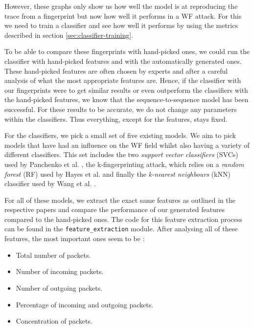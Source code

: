 However, these graphs only show us how well the model is at reproducing the trace from a fingerprint but now how well it performs in a WF attack.
For this we need to train a classifier and see how well it performs by using the metrics described in section \ref{sec:classifier-training}.

To be able to compare these fingerprints with hand-picked ones, we could run the classifier with hand-picked features and with the automatically generated ones.
These hand-picked features are often chosen by experts and after a careful analysis of what the most appropriate features are.
Hence, if the classifier with our fingerprints were to get similar results or even outperform the classifiers with the hand-picked features, we know that the sequence-to-sequence model has been successful.
For these results to be accurate, we do not change any parameters within the classifiers.
Thus everything, except for the features, stays fixed.

For the classifiers, we pick a small set of five existing models.
We aim to pick models that have had an influence on the WF field whilst also having a variety of different classifiers.
This set includes the two \textit{support vector classifiers} (SVCs) used by Panchenko et al. \cite{panchenko1,panchenko2},
the k-fingerprinting attack, which relies on a \textit{random forest} (RF) used by Hayes et al. \cite{kfingerprinting}
and finally the \textit{k-nearest neighbours} (kNN) classifier used by Wang et al. \cite{wang_cai_johnson_nithyanand_goldberg_2014}.

For all of these models, we extract the exact same features as outlined in the respective papers and compare the performance of our generated features compared to the hand-picked ones.
The code for this feature extraction process can be found in the \texttt{feature\_extraction} module.
After analysing all of these features, the most important ones seem to be \cite{panchenko1,panchenko2,kfingerprinting,wang_cai_johnson_nithyanand_goldberg_2014}:

\begin{itemize}
  \item Total number of packets.
  \item Number of incoming packets.
  \item Number of outgoing packets.
  \item Percentage of incoming and outgoing packets.
  \item Concentration of packets.
\end{itemize}

